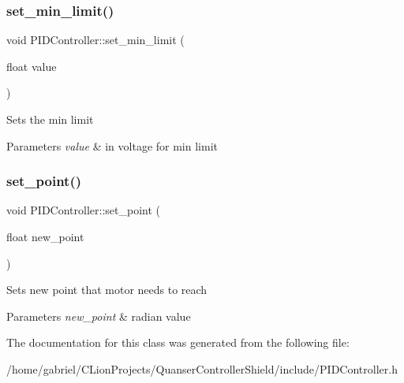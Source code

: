 \subsubsection{\texorpdfstring{set\+\_\+min\+\_\+limit()}{set\_min\_limit()}}
{\footnotesize\ttfamily void P\+I\+D\+Controller\+::set\+\_\+min\+\_\+limit (\begin{DoxyParamCaption}\item[{float}]{value }\end{DoxyParamCaption})}

Sets the min limit 
\begin{DoxyParams}{Parameters}
{\em value} & in voltage for min limit \\
\hline
\end{DoxyParams}
\mbox{\label{classPIDController_a71c93fafc54a8235f259f9d935fdaf79}} 
\subsubsection{\texorpdfstring{set\+\_\+point()}{set\_point()}}
{\footnotesize\ttfamily void P\+I\+D\+Controller\+::set\+\_\+point (\begin{DoxyParamCaption}\item[{float}]{new\+\_\+point }\end{DoxyParamCaption})}

Sets new point that motor needs to reach 
\begin{DoxyParams}{Parameters}
{\em new\+\_\+point} & radian value \\
\hline
\end{DoxyParams}


The documentation for this class was generated from the following file\+:\begin{DoxyCompactItemize}
\item 
/home/gabriel/\+C\+Lion\+Projects/\+Quanser\+Controller\+Shield/include/P\+I\+D\+Controller.\+h\end{DoxyCompactItemize}

